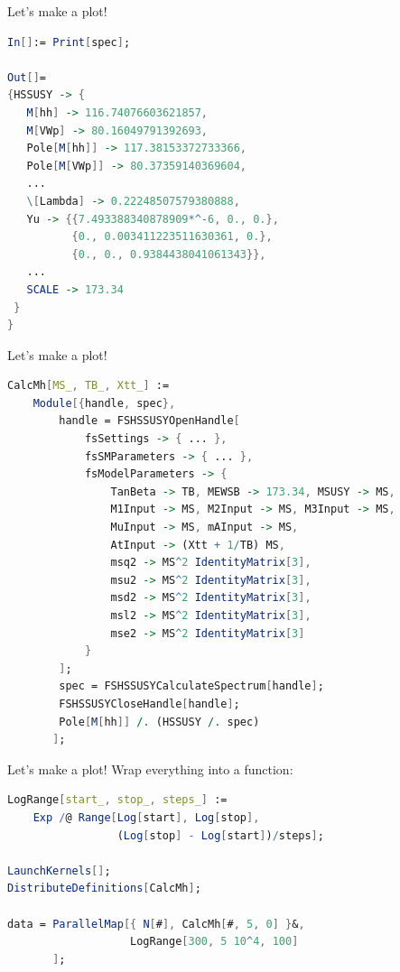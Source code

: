 \documentclass[hyperref={pdfpagelabels=false},ngerman]{beamer}
\begin{document}
\begin{frame}{Let's make a plot!}
  \usebox{\listbox}
\end{frame}

\begin{lrbox}{\listbox}\begin{lstlisting}[language=Mathematica]
In[]:= Print[spec];

Out[]=
{HSSUSY -> {
   M[hh] -> 116.74076603621857,
   M[VWp] -> 80.16049791392693,
   Pole[M[hh]] -> 117.38153372733366,
   Pole[M[VWp]] -> 80.37359140369604,
   ...
   \[Lambda] -> 0.22248507579380888,
   Yu -> {{7.493388340878909*^-6, 0., 0.},
          {0., 0.003411223511630361, 0.},
          {0., 0., 0.9384438041061343}},
   ...
   SCALE -> 173.34
 }
}
\end{lstlisting}\end{lrbox} %

\begin{frame}{Let's make a plot!}
  \usebox{\listbox}
\end{frame}

\begin{lrbox}{\listbox}\begin{lstlisting}[language=Mathematica]
CalcMh[MS_, TB_, Xtt_] :=
    Module[{handle, spec},
        handle = FSHSSUSYOpenHandle[
            fsSettings -> { ... },
            fsSMParameters -> { ... },
            fsModelParameters -> {
                TanBeta -> TB, MEWSB -> 173.34, MSUSY -> MS,
                M1Input -> MS, M2Input -> MS, M3Input -> MS,
                MuInput -> MS, mAInput -> MS,
                AtInput -> (Xtt + 1/TB) MS,
                msq2 -> MS^2 IdentityMatrix[3],
                msu2 -> MS^2 IdentityMatrix[3],
                msd2 -> MS^2 IdentityMatrix[3],
                msl2 -> MS^2 IdentityMatrix[3],
                mse2 -> MS^2 IdentityMatrix[3]
            }
        ];
        spec = FSHSSUSYCalculateSpectrum[handle];
        FSHSSUSYCloseHandle[handle];
        Pole[M[hh]] /. (HSSUSY /. spec)
       ];
\end{lstlisting}\end{lrbox} %

\begin{frame}{Let's make a plot!}
  Wrap everything into a function:\\[1em]
  \usebox{\listbox}
\end{frame}

\begin{lrbox}{\listbox}\begin{lstlisting}[language=Mathematica]
LogRange[start_, stop_, steps_] :=
    Exp /@ Range[Log[start], Log[stop],
                 (Log[stop] - Log[start])/steps];

LaunchKernels[];
DistributeDefinitions[CalcMh];

data = ParallelMap[{ N[#], CalcMh[#, 5, 0] }&,
                   LogRange[300, 5 10^4, 100]
       ];
\end{lstlisting}\end{lrbox} %
\end{document}
